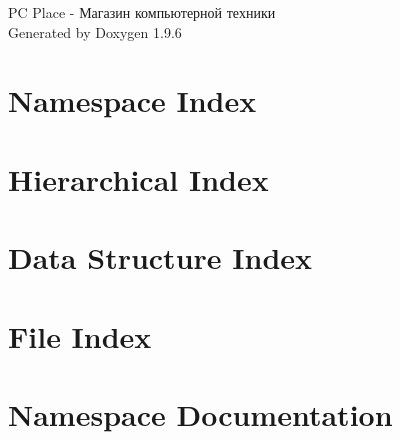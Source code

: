 \documentclass[twoside]{book}
\newcommand{\+}{\discretionary{\mbox{\scriptsize$\hookleftarrow$}}{}{}}
\newcommand{\clearemptydoublepage}{%
    \newpage{\pagestyle{empty}\cleardoublepage}%
  }
\begin{document}
  \raggedbottom
    \hypersetup{pageanchor=false,
                bookmarksnumbered=true,
                pdfencoding=unicode
               }
  \begin{titlepage}
  \vspace*{7cm}
  \begin{center}%
  {\Large PC Place -\/ Магазин компьютерной техники}\\
  \vspace*{1cm}
  {\large Generated by Doxygen 1.9.6}\\
  \end{center}
  \end{titlepage}
  \clearemptydoublepage
  \tableofcontents
  \clearemptydoublepage
  \hypersetup{pageanchor=true}
\chapter{Namespace Index}

\chapter{Hierarchical Index}

\chapter{Data Structure Index}

\chapter{File Index}

\chapter{Namespace Documentation}









\end{document}
